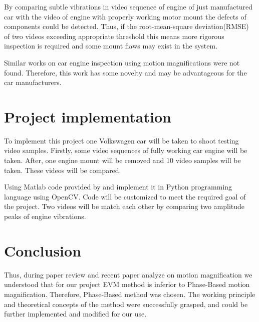 \documentclass{IEEEtran}
\begin{document}
By comparing subtle vibrations in video sequence of engine of just manufactured car with the video of engine with properly working motor mount the defects of components could be detected. Thus, if the root-mean-square deviation(RMSE) of two videos exceeding appropriate threshold this means more rigorous inspection is required and some mount flaws may exist in the system. 

Similar works on car engine inspection using motion magnifications were not found. Therefore, this work has some novelty and may be advantageous for the car manufacturers. 

\section{Project implementation}

To implement this project one Volkswagen car will be taken to shoot testing video samples. Firstly, some video sequences of fully working car engine will be taken. After, one engine mount will be removed and 10 video samples will be taken. These videos will be compared.

Using Matlab code provided by \cite{Wadhwa:2013:PVM:2461912.2461966} and implement it in Python programming language using OpenCV. Code will be customized to meet the required goal of the project. Two videos will be match each other by comparing two amplitude peaks of engine vibrations.

\section{Conclusion}

Thus, during paper review and recent paper analyze on motion magnification we understood that for our project EVM method is inferior to Phase-Based motion magnification. Therefore, Phase-Based method was chosen. The working principle and theoretical concepts of the method were successfully grasped, and could be further implemented and modified for our use.



\printbibliography
\end{document}
